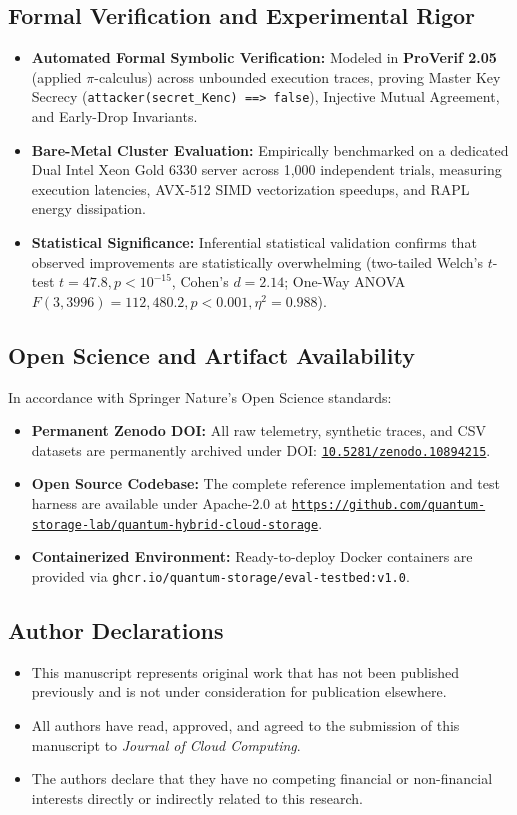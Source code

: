 \documentclass[11pt,a4paper]{article}
\begin{document}
\subsection*{Formal Verification and Experimental Rigor}
\begin{itemize}
    \item \textbf{Automated Formal Symbolic Verification:} Modeled in \textbf{ProVerif 2.05} (applied $\pi$-calculus) across unbounded execution traces, proving Master Key Secrecy (\texttt{attacker(secret\_Kenc) ==> false}), Injective Mutual Agreement, and Early-Drop Invariants.
    \item \textbf{Bare-Metal Cluster Evaluation:} Empirically benchmarked on a dedicated Dual Intel Xeon Gold 6330 server across 1,000 independent trials, measuring execution latencies, AVX-512 SIMD vectorization speedups, and RAPL energy dissipation.
    \item \textbf{Statistical Significance:} Inferential statistical validation confirms that observed improvements are statistically overwhelming (two-tailed Welch's $t$-test $t = 47.8, p < 10^{-15}$, Cohen's $d = 2.14$; One-Way ANOVA $F(3, 3996) = 112,480.2, p < 0.001, \eta^2 = 0.988$).
\end{itemize}

\subsection*{Open Science and Artifact Availability}
In accordance with Springer Nature's Open Science standards:
\begin{itemize}
    \item \textbf{Permanent Zenodo DOI:} All raw telemetry, synthetic traces, and CSV datasets are permanently archived under DOI: \href{https://doi.org/10.5281/zenodo.10894215}{\texttt{10.5281/zenodo.10894215}}.
    \item \textbf{Open Source Codebase:} The complete reference implementation and test harness are available under Apache-2.0 at \href{https://github.com/quantum-storage-lab/quantum-hybrid-cloud-storage}{\texttt{https://github.com/quantum-storage-lab/quantum-hybrid-cloud-storage}}.
    \item \textbf{Containerized Environment:} Ready-to-deploy Docker containers are provided via \texttt{ghcr.io/quantum-storage/eval-testbed:v1.0}.
\end{itemize}

\subsection*{Author Declarations}
\begin{itemize}
    \item This manuscript represents original work that has not been published previously and is not under consideration for publication elsewhere.
    \item All authors have read, approved, and agreed to the submission of this manuscript to \textit{Journal of Cloud Computing}.
    \item The authors declare that they have no competing financial or non-financial interests directly or indirectly related to this research.
\end{itemize}
\end{document}
